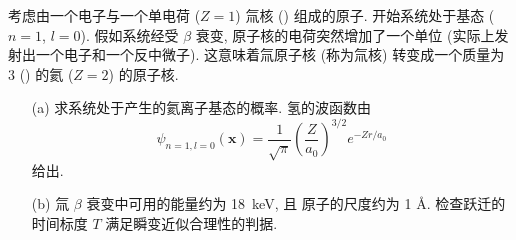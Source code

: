 \documentclass{assignment}
\begin{document}
\begin{prob}[课本习题 5.35]
    考虑由一个电子与一个单电荷 ($Z=1$) 氚核 () 组成的原子. 开始系统处于基态 ($n=1$, $l=0$). 假如系统经受 $\beta$ 衰变, 原子核的电荷突然增加了一个单位 (实际上发射出一个电子和一个反中微子). 这意味着氚原子核 (称为氚核) 转变成一个质量为 $3$ () 的氦 ($Z=2$) 的原子核.
    \begin{itemize}
        \item[(a)] 求系统处于产生的氦离子基态的概率. 氢的波函数由
        \[
            \psi_{n=1,l=0}(\bm{x})=\frac{1}{\sqrt{\pi}}\left(\frac{Z}{a_0}\right)^{3/2}e^{-Zr/a_0}
        \]
        给出.
        \item[(b)] 氚 $\beta$ 衰变中可用的能量约为 \SI{18}{keV}, 且  原子的尺度约为 1 \AA. 检查跃迁的时间标度 $T$ 满足瞬变近似合理性的判据.
    \end{itemize}
\end{prob}
\end{document}
